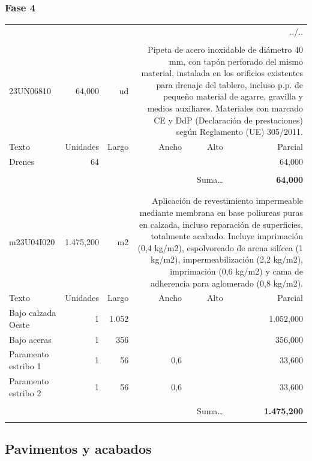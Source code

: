 \documentclass{book}%
\begin{document}
%
\subsubsection{Fase 4}%
\begin{longtable}{lrrrrr}%
\multicolumn{6}{r}{../..}\\%
\endfoot%
\endlastfoot%
&&&&&\\%
23UN06810&    64,000& ud&\multicolumn{3}{p{6cm}}{\scriptsize Pipeta de acero inoxidable de diámetro 40 mm, con tapón perforado del mismo material, instalada en los orificios existentes para drenaje del tablero, incluso p.p. de pequeño material de agarre, gravilla y medios auxiliares. Materiales con marcado CE y DdP (Declaración de prestaciones) según Reglamento (UE) 305/2011.\normalsize}\\%
Texto&Unidades&Largo&Ancho&Alto&Parcial\\%
\hline%
\multicolumn{1}{p{3.5cm}}{Drenes}&64&&&&    64,000\\%
&&&&&\\%
\multicolumn{5}{r}{Suma\ldots}&\textbf{    64,000}\\%
\hline%
&&&&&\\%
&&&&&\\%
m23U04I020& 1.475,200& m2&\multicolumn{3}{p{6cm}}{\scriptsize Aplicación de revestimiento impermeable mediante membrana en base poliureas puras en calzada, incluso reparación de superficies, totalmente acabado. Incluye imprimación (0,4 kg/m2), espolvoreado de arena silícea (1 kg/m2), impermeabilización (2,2 kg/m2), imprimación (0,6 kg/m2) y cama de adherencia para aglomerado (0,8 kg/m2).\normalsize}\\%
Texto&Unidades&Largo&Ancho&Alto&Parcial\\%
\hline%
\multicolumn{1}{p{3.5cm}}{Bajo calzada Oeste }&1&1.052&&& 1.052,000\\%
\multicolumn{1}{p{3.5cm}}{Bajo aceras }&1&356&&&   356,000\\%
\multicolumn{1}{p{3.5cm}}{Paramento estribo 1}&1&56&0,6&&    33,600\\%
\multicolumn{1}{p{3.5cm}}{Paramento estribo 2}&1&56&0,6&&    33,600\\%
&&&&&\\%
\multicolumn{5}{r}{Suma\ldots}&\textbf{ 1.475,200}\\%
\hline%
&&&&&\\%
\end{longtable}%
\newpage

%
\subsection{Pavimentos y acabados}%
\end{document}
